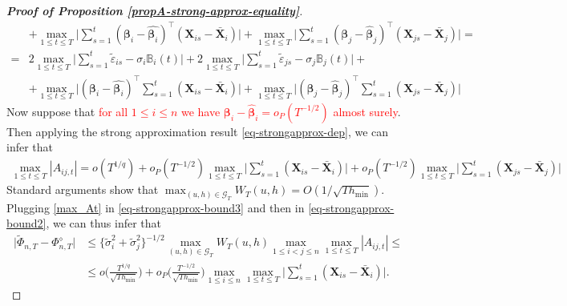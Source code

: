\begin{proof}[\textnormal{\textbf{Proof of Proposition \ref{propA-strong-approx-equality}}}]
\begin{align*}
& + \max_{1 \le t \le T} \Big|\sum\limits_{s=1}^t(\bm{\beta}_i - \widehat{\bm{\beta}_i})^\top (\mathbf{X}_{is} - \bar{\mathbf{X}}_{i}) \Big| 
+ \max_{1 \le t \le T} \Big|\sum\limits_{s=1}^t(\bm{\beta}_j - \widehat{\bm{\beta}}_j)^\top (\mathbf{X}_{js} - \bar{\mathbf{X}}_{j}) \Big| =\\
= & 2 \max_{1 \le t \le T} \Big| \sum\limits_{s=1}^t \widetilde{\varepsilon}_{is} - \sigma_i \mathbb{B}_{i}(t) \Big| + 2 \max_{1 \le t \le T} \Big| \sum\limits_{s=1}^t \widetilde{\varepsilon}_{js} - \sigma_j \mathbb{B}_{j}(t) \Big| +\\
& + \max_{1 \le t \le T} \Big|(\bm{\beta}_i - \widehat{\bm{\beta}_i})^\top\sum\limits_{s=1}^t (\mathbf{X}_{is} - \bar{\mathbf{X}}_{i}) \Big| 
+ \max_{1 \le t \le T} \Big|(\bm{\beta}_j - \widehat{\bm{\beta}}_j)^\top\sum\limits_{s=1}^t (\mathbf{X}_{js} - \bar{\mathbf{X}}_{j}) \Big|
\end{align*}
Now suppose that \textcolor{red}{for all $1 \le i \le n$ we have $\bm{\beta}_i - \widehat{\bm{\beta}}_i = o_P(T^{-1/2})$ almost surely}. Then applying the strong approximation result \eqref{eq-strongapprox-dep}, we can infer that
\begin{align}\label{max_At}
\max_{1 \le t \le T} |A_{ij, t}|  = o(T^{1/q}) + o_P(T^{-1/2})\max_{1 \le t \le T}\Big|\sum\limits_{s=1}^t (\mathbf{X}_{is} - \bar{\mathbf{X}}_{i})\Big| +  o_P(T^{-1/2})\max_{1 \le t \le T}\Big|\sum\limits_{s=1}^t (\mathbf{X}_{js} - \bar{\mathbf{X}}_{j} )\Big|
\end{align}
Standard arguments show that $\max_{(u,h) \in \mathcal{G}_T} W_T(u,h) = O( 1/\sqrt{Th_{\min}} )$. Plugging \eqref{max_At} in \eqref{eq-strongapprox-bound3} and then in \eqref{eq-strongapprox-bound2}, we can thus infer that 
\begin{align}\label{eq-strongapprox-bound4}
\big| \widetilde{\Phi}_{n, T} - \Phi_{n, T}^{\diamond} \big| &\le \{\widetilde{\sigma}_i^2 + \widetilde{\sigma}_j^2 \}^{-1/2}  \max_{(u,h) \in \mathcal{G}_T} W_T(u, h) \max_{1\le i < j \le n}\max_{1\le t \le T} |A_{ij, t}|\le\nonumber \\
&\le o\Big( \frac{T^{1/q}}{\sqrt{Th_{\min}}} \Big) + o_P \Big( \frac{T^{-1/2}}{\sqrt{Th_{\min}}} \Big)\max_{1 \le i \le n}\max_{1\le t \le T}\Big|\sum\limits_{s=1}^t (\mathbf{X}_{is} - \bar{\mathbf{X}}_{i} )\Big|.
\end{align}


\end{proof}
